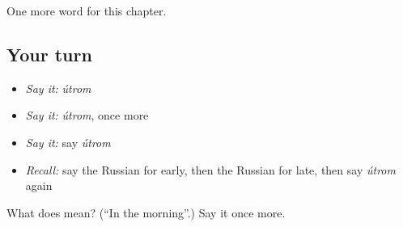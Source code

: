 \begin{grammarlens}[title={What you've built}]
One more word for this chapter.
\end{grammarlens}

\subsection*{Your turn}
\begin{itemize}
\raggedright
  \item \emph{Say it:} \emph{útrom}
  \item \emph{Say it:} \emph{útrom}, once more
  \item \emph{Say it:} say \emph{útrom}
  \item \emph{Recall:} say the Russian for early, then the Russian for late, then say \emph{útrom} again
\end{itemize}

\begin{tcolorbox}[breakable,colback=teal!4,colframe=teal!35!black,title={Before you move on}]
What does  mean? (\textquotedblleft{}In the morning\textquotedblright{}.) Say it once more.
\end{tcolorbox}
